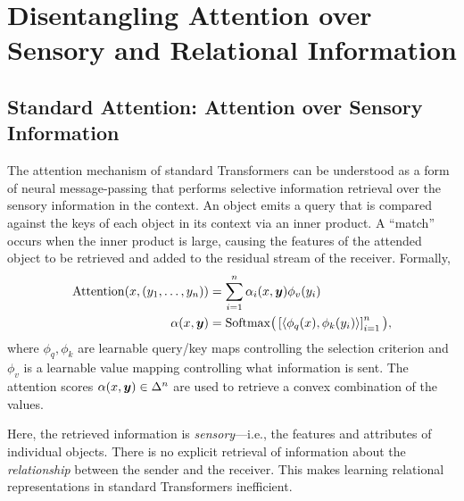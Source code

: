 \section{Disentangling Attention over Sensory and Relational Information}

\subsection{Standard Attention: Attention over Sensory Information}

The attention mechanism of standard Transformers can be understood as a form of neural message-passing that performs selective information retrieval over the sensory information in the context. An object emits a query that is compared against the keys of each object in its context via an inner product. A ``match'' occurs when the inner product is large, causing the features of the attended object to be retrieved and added to the residual stream of the receiver. Formally, %
\begin{equation}\label{eq:self_attn}
  \begin{split}
    \mathrm{Attention}(x, (y_1, \ldots, y_n)) &= \sum_{i=1}^{n} \alpha_i(x, \bm{y}) \phi_v(y_i) \\
    \alpha(x, \bm{y}) &= \mathrm{Softmax}\big(\left[\left \langle \phi_q(x), \phi_k(y_i) \right\rangle\right]_{i=1}^{n}\big),
  \end{split}
\end{equation}
where $\phi_q,\phi_k$ are learnable query/key maps controlling the selection criterion and $\phi_v$ is a learnable value mapping controlling what information is sent. The attention scores $\alpha(x, \bm{y}) \in \Delta^n$ are used to retrieve a convex combination of the values.

Here, the retrieved information is \textit{sensory}---i.e., the features and attributes of individual objects. There is no explicit retrieval of information about the \textit{relationship} between the sender and the receiver. This makes learning relational representations in standard Transformers inefficient.


